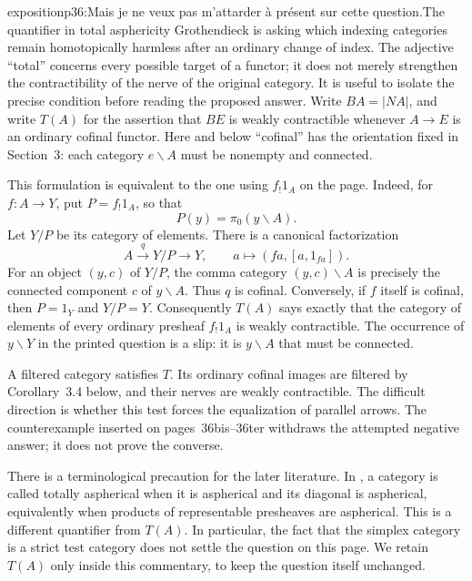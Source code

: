 \begin{dcomment}{exposition}{p36:Mais je ne veux pas m'attarder à présent sur cette question.}{The quantifier in total asphericity}
Grothendieck is asking which indexing categories remain homotopically harmless after an ordinary change of index. The adjective ``total'' concerns every possible target of a functor; it does not merely strengthen the contractibility of the nerve of the original category. It is useful to isolate the precise condition before reading the proposed answer. Write $B A=|N A|$, and write $T(A)$ for the assertion that $B E$ is weakly contractible whenever $A\longrightarrow E$ is an ordinary cofinal functor. Here and below ``cofinal'' has the orientation fixed in Section~3: each category $e\backslash A$ must be nonempty and connected.

This formulation is equivalent to the one using $f_!1_A$ on the page. Indeed, for $f:A\longrightarrow Y$, put $P=f_!1_A$, so that
\[
 P(y)=\pi_0(y\backslash A).
\]
Let $Y/P$ be its category of elements. There is a canonical factorization
\[
 A\xrightarrow{q}Y/P\longrightarrow Y,
 \qquad a\longmapsto(fa,[a,1_{fa}]).
\]
For an object $(y,c)$ of $Y/P$, the comma category $(y,c)\backslash A$ is precisely the connected component $c$ of $y\backslash A$. Thus $q$ is cofinal. Conversely, if $f$ itself is cofinal, then $P=1_Y$ and $Y/P=Y$. Consequently $T(A)$ says exactly that the category of elements of every ordinary presheaf $f_!1_A$ is weakly contractible. The occurrence of $y\backslash Y$ in the printed question is a slip: it is $y\backslash A$ that must be connected.

A filtered category satisfies $T$. Its ordinary cofinal images are filtered by Corollary~3.4 below, and their nerves are weakly contractible. The difficult direction is whether this test forces the equalization of parallel arrows. The counterexample inserted on pages~36bis--36ter withdraws the attempted negative answer; it does not prove the converse.

There is a terminological precaution for the later literature. In \citet[Definition~1.7.2 and Proposition~1.7.1]{Maltsiniotis2020}, a category is called totally aspherical when it is aspherical and its diagonal is aspherical, equivalently when products of representable presheaves are aspherical. This is a different quantifier from $T(A)$. In particular, the fact that the simplex category is a strict test category does not settle the question on this page. We retain $T(A)$ only inside this commentary, to keep the question itself unchanged.
\end{dcomment}

